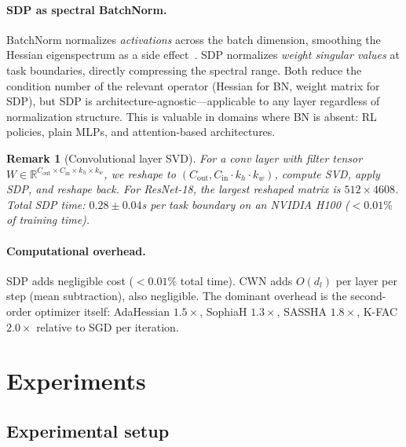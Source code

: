 \documentclass{article}
\newtheorem{remark}{Remark}
\newcommand{\RR}{\mathbb{R}}
\begin{document}
\paragraph{SDP as spectral BatchNorm.}
BatchNorm normalizes \emph{activations} across the batch dimension, smoothing the Hessian eigenspectrum as a side effect~\citep{ghorbani2019investigation}. SDP normalizes \emph{weight singular values} at task boundaries, directly compressing the spectral range. Both reduce the condition number of the relevant operator (Hessian for BN, weight matrix for SDP), but SDP is architecture-agnostic---applicable to any layer regardless of normalization structure. This is valuable in domains where BN is absent: RL policies, plain MLPs, and attention-based architectures.

\begin{remark}[Convolutional layer SVD]
\label{rem:conv_svd}
For a conv layer with filter tensor $W \in \RR^{C_{\mathrm{out}} \times C_{\mathrm{in}} \times k_h \times k_w}$, we reshape to $(C_{\mathrm{out}}, C_{\mathrm{in}} \cdot k_h \cdot k_w)$, compute SVD, apply SDP, and reshape back. For ResNet-18, the largest reshaped matrix is $512 \times 4608$. Total SDP time: $0.28 \pm 0.04$s per task boundary on an NVIDIA H100 ($<0.01\%$ of training time).
\end{remark}

\paragraph{Computational overhead.} SDP adds negligible cost ($<0.01\%$ total time). CWN adds $O(d_l)$ per layer per step (mean subtraction), also negligible. The dominant overhead is the second-order optimizer itself: AdaHessian $1.5\times$, SophiaH $1.3\times$, SASSHA $1.8\times$, K-FAC $2.0\times$ relative to SGD per iteration.

\section{Experiments}
\label{sec:experiments}

\subsection{Experimental setup}
\end{document}
